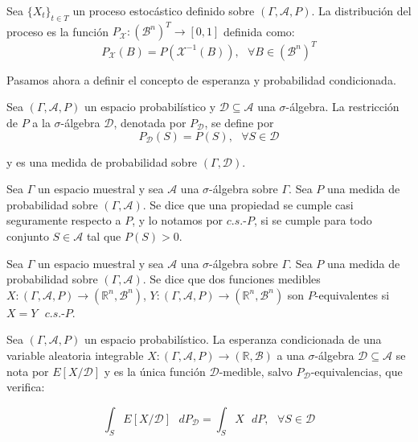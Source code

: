 \begin{definicion}
Sea $\{X_t\}_{t\in T}$ un proceso estocástico definido sobre $(\Gamma, \mathcal{A}, P)$. La distribución del proceso es la función $P_{\mathcal{X}}:(\mathscr{B}^n)^T\rightarrow [0,1]$ definida como:
$$P_{\mathcal{X}}(B) = P(\mathcal{X}^{-1}(B)), \text{ } \forall B\in (\mathscr{B}^n)^T $$
\end{definicion}
\fi

Pasamos ahora a definir el concepto de esperanza y probabilidad condicionada.

\begin{definicion}
Sea $(\Gamma, \mathcal{A}, P)$ un espacio probabilístico y $\mathcal{D}\subseteq \mathcal{A}$ una $\sigma$-álgebra. La restricción de $P$ a la $\sigma$-álgebra $\mathcal{D}$, denotada por $P_{\mathcal{D}}$, se define por
$$P_{\mathcal{D}}(S) = P(S), \text{ }\forall S\in \mathcal{D}$$

y es una medida de probabilidad sobre $(\Gamma, \mathcal{D})$.
\end{definicion}

\begin{definicion}
Sea $\Gamma$ un espacio muestral y sea $\mathcal{A}$ una $\sigma$-álgebra sobre $\Gamma$. Sea $P$ una medida de probabilidad sobre $(\Gamma, \mathcal{A})$. Se dice que una propiedad se cumple casi seguramente respecto a $P$, y lo notamos por $c.s.\text{-}P$, si se cumple para todo conjunto $S\in \mathcal{A}$ tal que $P(S)>0$.
\end{definicion}

\begin{definicion}[P-equivalencias]
Sea $\Gamma$ un espacio muestral y sea $\mathcal{A}$ una $\sigma$-álgebra sobre $\Gamma$. Sea $P$ una medida de probabilidad sobre $(\Gamma, \mathcal{A})$. Se dice que dos funciones medibles $X:(\Gamma, \mathcal{A}, P) \rightarrow (\mathds{R}^n, \mathscr{B}^n)$, $Y:(\Gamma, \mathcal{A}, P) \rightarrow (\mathds{R}^n, \mathscr{B}^n)$ son $P$-equivalentes si $X = Y\text{ } c.s.\text{-}P$.
\end{definicion}

\begin{definicion}\label{EspCond}
Sea $(\Gamma, \mathcal{A}, P)$ un espacio probabilístico. La esperanza condicionada de una variable aleatoria integrable $X:(\Gamma, \mathcal{A}, P)\rightarrow (\mathds{R}, \mathscr{B})$ a una $\sigma$-álgebra $\mathcal{D}\subseteq \mathcal{A}$ se nota por $E[X/\mathcal{D}]$ y es la única función $\mathcal{D}$-medible, salvo $P_{\mathcal{D}}$-equivalencias, que verifica:

\begin{equation}\label{ecEspCond}
\int _S E[X/\mathcal{D}]\text{ }dP_{\mathcal{D}} = \int_S X\text{ }dP,\text{ }\forall S\in\mathcal{D}
\end{equation}

\end{definicion}

